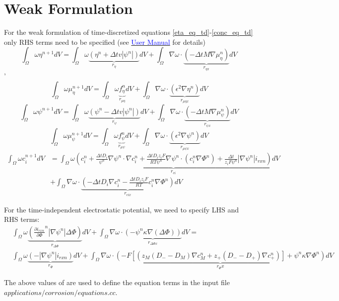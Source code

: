 \documentclass[11pt]{article}
\renewcommand{\=}[1]{\stackrel{#1}{=}} %
\theoremstyle{definition}
\theoremstyle{remark}
\begin{document}
\section{Weak Formulation}
For the weak formulation of time-discretized equations \eqref{eta_eq_td}-\eqref{conc_eq_td} only RHS terms need to be specified (see \href{https://prisms-center.github.io/phaseField/doxygen_files/app_files.html}{\textcolor{blue}{User Manual}} for details)
\begin{equation}
\int_{\Omega} \omega \eta^{n+1} dV = \int_{\Omega} \omega \underbrace{\left( \eta^n +\Delta t v  |\psi^n|\right)}_{r_\eta}dV + \int_{\Omega} \nabla \omega \cdot  \underbrace{\left(-  \Delta t M \nabla \mu_\eta^n \right)}_{r_{\eta x}}dV
\end{equation}'
\begin{equation}
\int_{\Omega} \omega \mu_\eta^{n+1} dV = \int_{\Omega} \omega \underbrace{f_\eta^n}_{r_{\mu \eta}}dV + \int_{\Omega} \nabla \omega \cdot  \underbrace{(\epsilon^2\nabla\eta^n)}_{r_{\mu \eta x}}dV
\end{equation}
\begin{equation}
\int_{\Omega} \omega \psi^{n+1} dV = \int_{\Omega} \omega \underbrace{\left( \psi^n -\Delta t v  |\psi^n|\right)}_{r_\psi} dV+ \int_{\Omega} \nabla \omega \cdot  \underbrace{\left(-  \Delta t M \nabla \mu_\psi^n \right)}_{r_{\psi x}}dV
\end{equation}
\begin{equation}
\int_{\Omega} \omega \mu_\psi^{n+1} dV = \int_{\Omega} \omega \underbrace{f_\psi^n}_{r_{\mu \psi}}dV + \int_{\Omega} \nabla \omega \cdot  \underbrace{(\epsilon^2\nabla\psi^n)}_{r_{\mu \psi x}}dV
\end{equation}
\begin{align}
\int_{\Omega} \omega c_i^{n+1} dV &=\int_{\Omega} \omega \underbrace{\left( c_i^n+\frac{\Delta t D_i}{\psi^n}\nabla\psi^n\cdot\nabla c_i^n 
+\frac{\Delta t D_i z_i F}{RT\psi^n}\nabla\psi^n\cdot(c_i^n\nabla \Phi^n) +\frac{\Delta t}{z_i F\psi^n} |\nabla\psi^n| i_{rxn}\right)}_{r_{ci}} dV\\ 
&+ \int_{\Omega} \nabla \omega \cdot  \underbrace{\left( -\Delta t D_i \nabla c_i^n -\frac{\Delta t D_i z_i F}{RT} c_i^n\nabla \Phi^n \right)}_{r_{cix}}dV
\end{align}

For the time-independent electrostatic potential, we need to specify LHS and RHS terms:
\begin{align}
&\int_{\Omega} \omega  \underbrace{\left( \frac{\partial i_{rxn}}{\partial \Phi}^n |\nabla\psi^n| \Delta\Phi\right)}_{r_{\Delta \Phi}} dV 
+ \int_{\Omega} \nabla\omega \cdot  \underbrace{\left( -\psi^n \kappa  \nabla(\Delta\Phi)\right)}_{r_{\Delta \Phi x}} dV =\\
&\int_{\Omega} \omega  \underbrace{\left( -|\nabla\psi^n| i_{rxn} \right)}_{r_\Phi} dV + \int_{\Omega} \nabla\omega \cdot  \underbrace{\left( -F  \left[ \left( z_M (D_- - D_M) \nabla c_M^n + z_+ (D_- - D_+)  \nabla c_+^n \right) \right] +\psi^n \kappa \nabla\Phi^n \right)}_{r_\Phi x} dV
\end{align}

The above values of are used to define the equation terms in the input file $applications/corrosion/equations.cc$.
\end{document}
